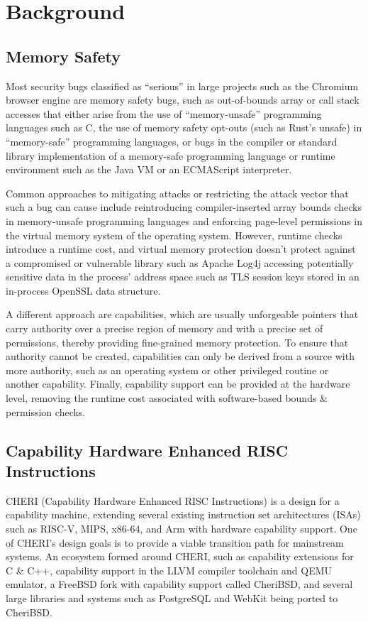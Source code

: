 \documentclass[main.tex]{subfiles}
\begin{document}
\mainmatter

\chapter{Background}

\section{Memory Safety}

Most security bugs classified as “serious” in large projects such as the Chromium browser engine are memory safety bugs,\cite{chromium} such as out-of-bounds array or call stack accesses that either arise from the use of “memory-unsafe” programming languages such as C, the use of memory safety opt-outs (such as Rust’s unsafe) in “memory-safe” programming languages, or bugs in the compiler or standard library implementation of a memory-safe programming language or runtime environment such as the Java VM or an ECMAScript interpreter.

Common approaches to mitigating attacks or restricting the attack vector that such a bug can cause include reintroducing compiler-inserted array bounds checks in memory-unsafe programming languages and enforcing page-level permissions in the virtual memory system of the operating system. However, runtime checks introduce a runtime cost, and virtual memory protection doesn’t protect against a compromised or vulnerable library such as Apache Log4j accessing potentially sensitive data in the process’ address space such as TLS session keys stored in an in-process OpenSSL data structure.

A different approach are capabilities, which are usually unforgeable pointers that carry authority over a precise region of memory and with a precise set of permissions, thereby providing fine-grained memory protection. To ensure that authority cannot be created, capabilities can only be derived from a source with more authority, such as an operating system or other privileged routine or another capability. Finally, capability support can be provided at the hardware level, removing the runtime cost associated with software-based bounds \& permission checks.

\section{Capability Hardware Enhanced RISC Instructions}
CHERI (Capability Hardware Enhanced RISC Instructions) is a design for a capability machine, extending several existing instruction set architectures (ISAs) such as RISC-V, MIPS, x86-64, and Arm with hardware capability support. One of CHERI’s design goals is to provide a viable transition path for mainstream systems. An ecosystem formed around CHERI, such as capability extensions for C \& C++, capability support in the LLVM compiler toolchain and QEMU emulator, a FreeBSD fork with capability support called CheriBSD, and several large libraries and systems such as PostgreSQL and WebKit being ported to CheriBSD.
\end{document}
